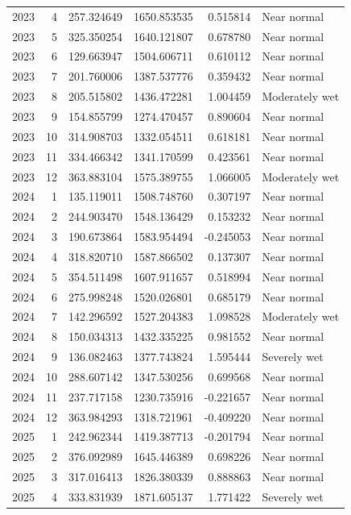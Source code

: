 \begin{tabular}{rrrrrl}
2023 & 4 & 257.324649 & 1650.853535 & 0.515814 & Near normal \\
2023 & 5 & 325.350254 & 1640.121807 & 0.678780 & Near normal \\
2023 & 6 & 129.663947 & 1504.606711 & 0.610112 & Near normal \\
2023 & 7 & 201.760006 & 1387.537776 & 0.359432 & Near normal \\
2023 & 8 & 205.515802 & 1436.472281 & 1.004459 & Moderately wet \\
2023 & 9 & 154.855799 & 1274.470457 & 0.890604 & Near normal \\
2023 & 10 & 314.908703 & 1332.054511 & 0.618181 & Near normal \\
2023 & 11 & 334.466342 & 1341.170599 & 0.423561 & Near normal \\
2023 & 12 & 363.883104 & 1575.389755 & 1.066005 & Moderately wet \\
2024 & 1 & 135.119011 & 1508.748760 & 0.307197 & Near normal \\
2024 & 2 & 244.903470 & 1548.136429 & 0.153232 & Near normal \\
2024 & 3 & 190.673864 & 1583.954494 & -0.245053 & Near normal \\
2024 & 4 & 318.820710 & 1587.866502 & 0.137307 & Near normal \\
2024 & 5 & 354.511498 & 1607.911657 & 0.518994 & Near normal \\
2024 & 6 & 275.998248 & 1520.026801 & 0.685179 & Near normal \\
2024 & 7 & 142.296592 & 1527.204383 & 1.098528 & Moderately wet \\
2024 & 8 & 150.034313 & 1432.335225 & 0.981552 & Near normal \\
2024 & 9 & 136.082463 & 1377.743824 & 1.595444 & Severely wet \\
2024 & 10 & 288.607142 & 1347.530256 & 0.699568 & Near normal \\
2024 & 11 & 237.717158 & 1230.735916 & -0.221657 & Near normal \\
2024 & 12 & 363.984293 & 1318.721961 & -0.409220 & Near normal \\
2025 & 1 & 242.962344 & 1419.387713 & -0.201794 & Near normal \\
2025 & 2 & 376.092989 & 1645.446389 & 0.698226 & Near normal \\
2025 & 3 & 317.016413 & 1826.380339 & 0.888863 & Near normal \\
2025 & 4 & 333.831939 & 1871.605137 & 1.771422 & Severely wet \\

\end{tabular}
